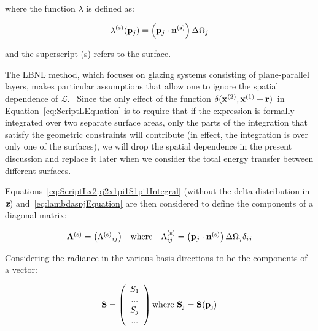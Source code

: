 where the function \(\lambda\) is defined as:

\begin{equation}
{\lambda ^{{\rm{(s)}}}}({{\bf{p}}_j}) = \left( {{{\bf{p}}_j}\cdot {{\bf{n}}^{{\rm{(s)}}}}} \right)\Delta {\Omega_j}
\label{eq:lambdaspjEquation}
\end{equation}

and the superscript (s) refers to the surface.

The LBNL method, which focuses on glazing systems consisting of plane-parallel layers, makes particular assumptions that allow one to ignore the spatial dependence of $\mathcal{L}$.~ Since the only effect of the function \(\delta ({{\bf{x}}^{{\rm{(2)}}}},{{\bf{x}}^{{\rm{(1)}}}} + {\bf{r}})\)~in Equation~\ref{eq:ScriptLEquation} is to require that if the expression is formally integrated over two separate surface areas, only the parts of the integration that satisfy the geometric constraints will contribute (in effect, the integration is over only one of the surfaces), we will drop the spatial dependence in the present discussion and replace it later when we consider the total energy transfer between different surfaces.

Equations~\ref{eq:ScriptLx2pj2x1pi1S1pi1Integral} (without the delta distribution in \textbf{\emph{x}}) and~\ref{eq:lambdaspjEquation} are then considered to define the components of a diagonal matrix:

\begin{equation}
\begin{array}{*{20}{c}}{{\bf{\Lambda }^{{\rm{(s)}}}} = \left( {{\Lambda ^{{\rm{(s)}}}}_{ij}} \right)}&{{\rm{where}}}&{\Lambda_{ij}^{{\rm{(s)}}} = \left( {{{\bf{p}}_j}\cdot {{\bf{n}}^{{\rm{(s)}}}}} \right)\Delta {\Omega_j}{\delta_{ij}}}\end{array}
\label{eq:LambdasEquation}
\end{equation}

Considering the radiance in the various basis directions to be the components of a vector:

\begin{equation}
\bf{S} = \left(
    \begin{array}{c}
      S_1 \\ ... \\ S_j \\ ...
    \end{array}
  \right)
  \text{where~}
  S_j = S(\bf{p}_j)
\end{equation}

